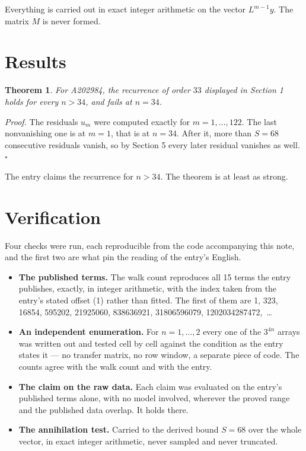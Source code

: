 \documentclass[11pt]{article}
\newtheorem{theorem}{Theorem}
\theoremstyle{definition}
\begin{document}
Everything is carried out in exact integer arithmetic on the vector $L^{m-1}y$. The matrix $M$ is never formed.

\section{Results}

\begin{theorem} For A202984, the recurrence of order $33$ displayed in Section 1 holds for every $n > 34$, and fails at $n = 34$.\end{theorem}

{\itshape Proof.} The residuals $u_m$ were computed exactly for $m = 1,\dots,122$. The last nonvanishing one is at $m = 1$, that is at $n = 34$. After it, more than $S = 68$ consecutive residuals vanish, so by Section 5 every later residual vanishes as well. $\square$

The entry claims the recurrence for $n > 34$. The theorem is at least as strong.

\section{Verification}

Four checks were run, each reproducible from the code accompanying this note, and the first two are what pin the reading of the entry's English.

\begin{itemize}

\item {\bfseries The published terms.} The walk count reproduces all 15 terms the entry publishes, exactly, in integer arithmetic, with the index taken from the entry's stated offset (1) rather than fitted. The first of them are 1, 323, 16854, 595202, 21925060, 838636921, 31806596079, 1202034287472,~\dots

\item {\bfseries An independent enumeration.} For $n = 1,\dots,2$ every one of the $3^{4n}$ arrays was written out and tested cell by cell against the condition as the entry states it --- no transfer matrix, no row window, a separate piece of code. The counts agree with the walk count and with the entry.

\item {\bfseries The claim on the raw data.} Each claim was evaluated on the entry's published terms alone, with no model involved, wherever the proved range and the published data overlap. It holds there.

\item {\bfseries The annihilation test.} Carried to the derived bound $S = 68$ over the whole vector, in exact integer arithmetic, never sampled and never truncated.

\end{itemize}
\end{document}
